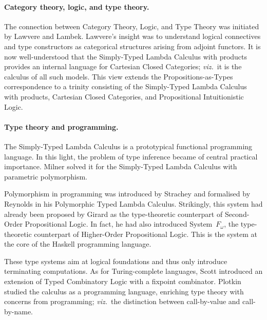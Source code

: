 \documentclass[11pt,twocolumn]{article}
\newcommand{\viz}{\emph{viz.}}
\newcommand{\lcalculus}{\mbox{$\lambda$-calculus}}
\newcommand{\SystemFomega}{\mbox{System~$F_\omega$}}
\begin{document}
\paragraph*{Category theory, logic, and type theory.}

The connection between Category Theory, Logic, and Type Theory was
initiated by Lawvere %
and Lambek. %
%
Lawvere's insight was to understand logical connectives and type constructors
as categorical structures arising from adjoint functors.  It is now
well-understood that the Simply-Typed Lambda Calculus with products provides
an internal language for Cartesian Closed Categories; \viz~it is the
calculus of all such models.  This view extends the Propositions-as-Types
correspondence to a trinity consisting of the Simply-Typed Lambda Calculus
\pagebreak%
with products, Cartesian Closed Categories, and Propositional
Intuitionistic Logic.

\paragraph*{Type theory and programming.}

The Simply-Typed Lambda Calculus is a prototypical functional programming
language.  In this light, the problem of type inference became of central
practical importance.  Milner %
solved it for the Simply-Typed Lambda Calculus with parametric polymorphism.  
 
Polymorphism in programming was introduced by Strachey %
and formalised by Reynolds %
in his Polymorphic Typed Lambda Calculus.
Strikingly, this system had already been proposed by
Girard %
as the type-theoretic counterpart of Second-Order Propositional Logic. 
In fact, he %
had also introduced {\SystemFomega}, the type-theoretic counterpart of
Higher-Order Propositional Logic.  
This is the system %
at the core of the Haskell programming language. 

These type systems aim at logical foundations and thus only introduce
terminating computations.  As for Turing-complete languages, 
Scott %
introduced an extension of Typed Combinatory Logic with a fixpoint combinator. 
Plotkin %
studied the calculus as a programming language, enriching type
theory with concerns from programming; \viz~the distinction between
call-by-value and call-by-name. %
\end{document}
